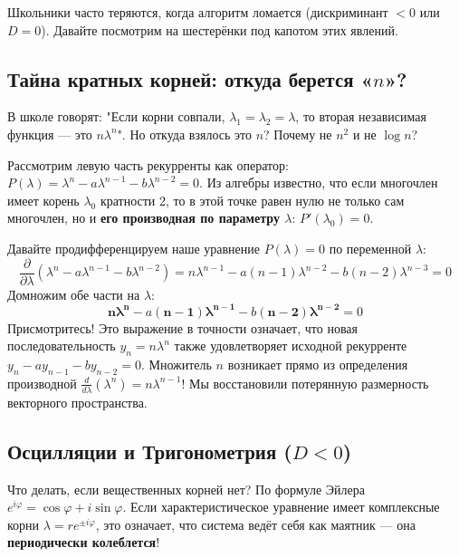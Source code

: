 \documentclass[12pt,a4paper]{article}
\begin{document}
Школьники часто теряются, когда алгоритм ломается (дискриминант $<0$ или $D=0$). Давайте посмотрим на шестерёнки под капотом этих явлений.

\subsection{Тайна кратных корней: откуда берется «$n$»?}

\begin{paradox}
В школе говорят: "Если корни совпали, $\lambda_1 = \lambda_2 = \lambda$, то вторая независимая функция — это $n \lambda^n$". Но откуда взялось это $n$? Почему не $n^2$ и не $\log n$?
\end{paradox}

Рассмотрим левую часть рекурренты как оператор: $P(\lambda) = \lambda^n - a\lambda^{n-1} - b\lambda^{n-2} = 0$. 
Из алгебры известно, что если многочлен имеет корень $\lambda_0$ кратности 2, то в этой точке равен нулю не только сам многочлен, но и \textbf{его производная по параметру $\lambda$}: $P'(\lambda_0) = 0$.

Давайте продифференцируем наше уравнение $P(\lambda)=0$ по переменной $\lambda$:
\[ \frac{\partial}{\partial \lambda} \left( \lambda^n - a\lambda^{n-1} - b\lambda^{n-2} \right) = n\lambda^{n-1} - a(n-1)\lambda^{n-2} - b(n-2)\lambda^{n-3} = 0 \]
Домножим обе части на $\lambda$:
\[ \bm{n\lambda^n} - a\bm{(n-1)\lambda^{n-1}} - b\bm{(n-2)\lambda^{n-2}} = 0 \]
Присмотритесь! Это выражение в точности означает, что новая последовательность $y_n = n \lambda^n$ также удовлетворяет исходной рекурренте $y_n - a y_{n-1} - b y_{n-2} = 0$. 
Множитель $n$ возникает прямо из определения производной $\frac{d}{d\lambda}(\lambda^n) = n \lambda^{n-1}$! Мы восстановили потерянную размерность векторного пространства.

\subsection{Осцилляции и Тригонометрия ($D < 0$)}

Что делать, если вещественных корней нет? По формуле Эйлера $e^{i\varphi} = \cos \varphi + i \sin \varphi$. Если характеристическое уравнение имеет комплексные корни $\lambda = r e^{\pm i\varphi}$, это означает, что система ведёт себя как маятник — она \textbf{периодически колеблется}!
\end{document}
